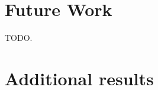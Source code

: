 \documentclass[11pt]{article}
\begin{document}


\section{Future Work}
\label{sec:future}
TODO.

\nocite{*}


\clearpage
\appendix
\section{Additional results}

\end{document}
